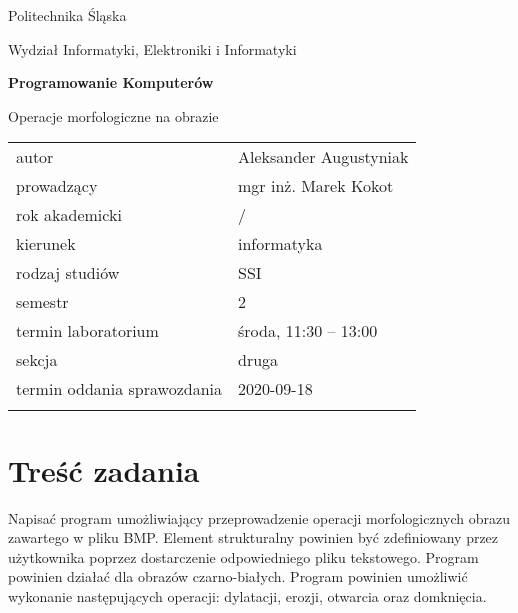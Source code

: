\documentclass[12pt,a4paper,twoside]{article}
\newcounter{rok}
\newcommand{\rokakademicki}{%
   \setcounter{rok}{\number\year}%
   \ifthenelse{\number\month<10}%
   {\addtocounter{rok}{-1}}%
   {}%
   \arabic{rok}/\addtocounter{rok}{1}\arabic{rok}
}
\begin{document}
\frenchspacing
\thispagestyle{empty}
\begin{center}
{\Large\sf Politechnika Śląska   %

Wydział Informatyki, Elektroniki i Informatyki

}

\vfill

 

\vfill\vfill

{\Huge\sffamily\bfseries Programowanie Komputerów\par}  

\vfill\vfill

{\LARGE\sf Operacje morfologiczne na obrazie}   


\vfill \vfill\vfill\vfill






\begin{tabular}{ll}
	\toprule
	autor                       & Aleksander Augustyniak     \\
	prowadzący                  & mgr inż. Marek Kokot  \\
	rok akademicki              & \rokakademicki         \\
	kierunek                    & informatyka            \\
	rodzaj studiów              & SSI                    \\
	semestr                     & 2                      \\
	termin laboratorium         & środa, 11:30 – 13:00 \\
	sekcja                      & druga                     \\
	termin oddania sprawozdania & 2020-09-18             \\
	\bottomrule
	                            &
\end{tabular}

\end{center}

\cleardoublepage

\section{Treść zadania}
Napisać program umożliwiający przeprowadzenie operacji morfologicznych obrazu zawartego w pliku BMP. Element strukturalny powinien być zdefiniowany przez użytkownika poprzez dostarczenie odpowiedniego pliku tekstowego. Program powinien działać dla obrazów czarno-białych. Program
powinien umożliwić wykonanie następujących operacji: dylatacji, erozji, otwarcia oraz domknięcia.
\end{document}
